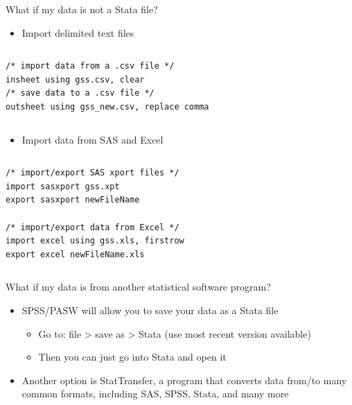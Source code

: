 \documentclass[table,smaller]{beamer}
\begin{document}
\begin{frame}[fragile,label=sec-2-4]{What if my data is not a Stata file?}
 \begin{itemize}
\item Import delimited text files
\end{itemize}
\vspace{-.5em} \begin{columns}  \begin{block}{}
\begin{verbatim}
/* import data from a .csv file */
insheet using gss.csv, clear
/* save data to a .csv file */
outsheet using gss_new.csv, replace comma
\end{verbatim}
\end{block} \end{columns}

\begin{itemize}
\item Import data from SAS and Excel
\end{itemize}
\vspace{-.5em} \begin{columns}  \begin{block}{}
\begin{verbatim}
/* import/export SAS xport files */
import sasxport gss.xpt
export sasxport newFileName

/* import/export data from Excel */
import excel using gss.xls, firstrow
export excel newFileName.xls
\end{verbatim}
\end{block} \end{columns}
\end{frame}
\begin{frame}[label=sec-2-5]{What if my data is from another statistical software program?}
\begin{itemize}
\item SPSS/PASW will allow you to save your data as a Stata file
\begin{itemize}
\item Go to: file > save as > Stata (use most   recent version available)
\item Then you can just go into Stata and   open it
\end{itemize}
\item Another option is \alert{StatTransfer}, a program that converts data from/to many common formats, including SAS, SPSS, Stata, and many more
\end{itemize}
\end{frame}
\end{document}
